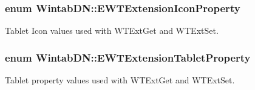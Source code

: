 \hypertarget{namespace_wintab_d_n_a4fb4432ff158db77a634fed851e23f6f}{
\subsubsection[{EWTExtensionIconProperty}]{\setlength{\rightskip}{0pt plus 5cm}enum {\bf WintabDN::EWTExtensionIconProperty}}}
\label{namespace_wintab_d_n_a4fb4432ff158db77a634fed851e23f6f}


Tablet Icon values used with WTExtGet and WTExtSet. 

\hypertarget{namespace_wintab_d_n_a21cb408997e6cbe0866e75b0fe0a743f}{
\subsubsection[{EWTExtensionTabletProperty}]{\setlength{\rightskip}{0pt plus 5cm}enum {\bf WintabDN::EWTExtensionTabletProperty}}}
\label{namespace_wintab_d_n_a21cb408997e6cbe0866e75b0fe0a743f}


Tablet property values used with WTExtGet and WTExtSet. 

